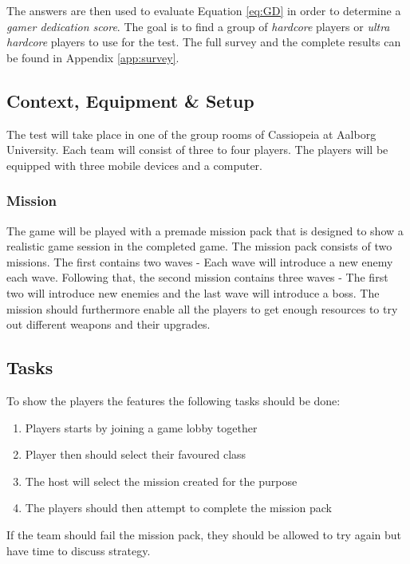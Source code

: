 The answers are then used to evaluate Equation \ref{eq:GD} in order to determine a \emph{gamer dedication score}.
The goal is to find a group of \emph{hardcore} players or \emph{ultra hardcore} players to use for the test.
The full survey and the complete results can be found in Appendix \ref{app:survey}.

\subsection{Context, Equipment \& Setup}
The test will take place in one of the group rooms of Cassiopeia at Aalborg University.
Each team will consist of three to four players.
The players will be equipped with three mobile devices and a computer.

\subsubsection{Mission}
The game will be played with a premade mission pack that is designed to show a realistic game session in the completed game.
The mission pack consists of two missions.
The first contains two waves - Each wave will introduce a new enemy each wave.
Following that, the second mission contains three waves - The first two will introduce new enemies and the last wave will introduce a boss.
The mission should furthermore enable all the players to get enough resources to try out different weapons and their upgrades.

\subsection{Tasks}
To show the players the features the following tasks should be done:
\begin{enumerate}
	\item Players starts by joining a game lobby together
	\item Player then should select their favoured class
	\item The host will select the mission created for the purpose
	\item The players should then attempt to complete the mission pack
\end{enumerate}
If the team should fail the mission pack, they should be allowed to try again but have time to discuss strategy.

